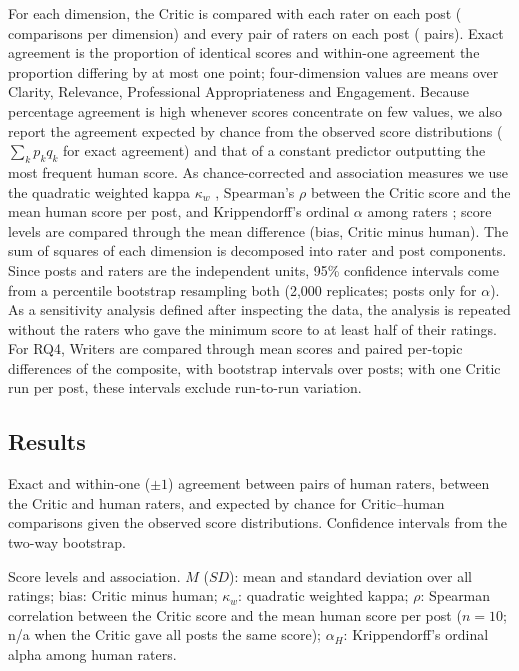\documentclass[a4paper,twoside]{article}
\begin{document}
For each dimension, the Critic is compared with each rater on each post (\NCHperDim{} comparisons per dimension) and every pair of raters on each post (\NHHperDim{} pairs). Exact agreement is the proportion of identical scores and within-one agreement the proportion differing by at most one point; four-dimension values are means over Clarity, Relevance, Professional Appropriateness and Engagement. Because percentage agreement is high whenever scores concentrate on few values, we also report the agreement expected by chance from the observed score distributions ($\sum_k p_k q_k$ for exact agreement) and that of a constant predictor outputting the most frequent human score. As chance-corrected and association measures we use the quadratic weighted kappa $\kappa_w$ \cite{cohen1968weighted}, Spearman's $\rho$ between the Critic score and the mean human score per post, and Krippendorff's ordinal $\alpha$ among raters \cite{krippendorff2018content}; score levels are compared through the mean difference (bias, Critic minus human). The sum of squares of each dimension is decomposed into rater and post components. Since posts and raters are the independent units, 95\% confidence intervals come from a percentile bootstrap resampling both \cite{efron1994bootstrap} (2,000 replicates; posts only for $\alpha$). As a sensitivity analysis defined after inspecting the data, the analysis is repeated without the \FlaggedN{} raters who gave the minimum score to at least half of their ratings. For RQ4, Writers are compared through mean scores and paired per-topic differences of the composite, with bootstrap intervals over posts; with one Critic run per post, these intervals exclude run-to-run variation.

\subsection{Results}

\begin{table}[t]
\centering
\caption{Exact and within-one ($\pm1$) agreement between pairs of human raters, between the Critic and human raters, and expected by chance for Critic--human comparisons given the observed score distributions. Confidence intervals from the two-way bootstrap.}
\label{tab:agreement}
\small

\end{table}

\begin{table}[t]
\centering
\caption{Score levels and association. $M$ ($SD$): mean and standard deviation over all ratings; bias: Critic minus human; $\kappa_w$: quadratic weighted kappa; $\rho$: Spearman correlation between the Critic score and the mean human score per post ($n=10$; n/a when the Critic gave all posts the same score); $\alpha_H$: Krippendorff's ordinal alpha among human raters.}
\label{tab:scores}
\small
\begin{adjustbox}{max width=\textwidth}

\end{adjustbox}
\end{table}
\end{document}

